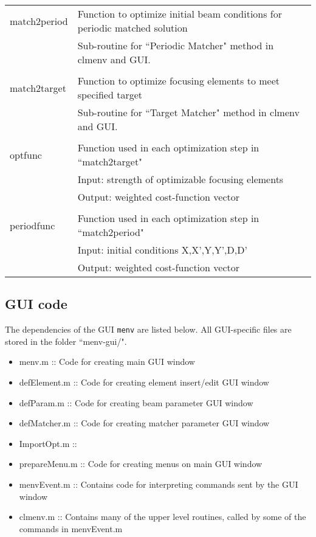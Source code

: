 \documentclass[../menv_main.tex]{subfiles}
\begin{document}
\begin{table}[htb]
\begin{tabularx}{\textwidth}{l X}
match2period& Function to optimize initial beam conditions for periodic matched solution \\
			& Sub-routine for ``Periodic Matcher" method in clmenv and GUI. \\
			&\\
match2target& Function to optimize focusing elements to meet specified target \\
			& Sub-routine for ``Target Matcher" method in clmenv and GUI. \\
			&\\
optfunc 	& Function used in each optimization step in ``match2target" \\
			& Input: strength of optimizable focusing elements \\
			& Output: weighted cost-function vector \\
			&\\
periodfunc 	& Function used in each optimization step in ``match2period" \\
			& Input: initial conditions X,X',Y,Y',D,D' \\
			& Output: weighted cost-function vector \\
\hline
\end{tabularx}
\end{table}


\subsection{GUI code}
The dependencies of the GUI \verb|menv| are listed below. All GUI-specific files are stored in the folder ``menv-gui/".

\begin{itemize}
\item menv.m :: Code for creating main GUI window
\item defElement.m :: Code for creating element insert/edit GUI window
\item defParam.m :: Code for creating beam parameter GUI window
\item defMatcher.m :: Code for creating matcher parameter GUI window
\item ImportOpt.m :: 
\item prepareMenu.m :: Code for creating menus on main GUI window
\item menvEvent.m :: Contains code for interpreting commands sent by the GUI window
\item clmenv.m :: Contains many of the upper level routines, called by some of the commands in menvEvent.m
\end{itemize}
\end{document}
